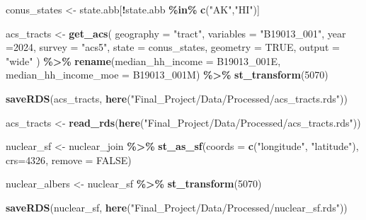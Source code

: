 \documentclass[
]{article}
\newenvironment{Shaded}{\begin{snugshade}}{\end{snugshade}}
\newcommand{\AttributeTok}[1]{\textcolor[rgb]{0.13,0.29,0.53}{#1}}
\newcommand{\ConstantTok}[1]{\textcolor[rgb]{0.56,0.35,0.01}{#1}}
\newcommand{\DecValTok}[1]{\textcolor[rgb]{0.00,0.00,0.81}{#1}}
\newcommand{\FunctionTok}[1]{\textcolor[rgb]{0.13,0.29,0.53}{\textbf{#1}}}
\newcommand{\NormalTok}[1]{#1}
\newcommand{\OtherTok}[1]{\textcolor[rgb]{0.56,0.35,0.01}{#1}}
\newcommand{\SpecialCharTok}[1]{\textcolor[rgb]{0.81,0.36,0.00}{\textbf{#1}}}
\newcommand{\StringTok}[1]{\textcolor[rgb]{0.31,0.60,0.02}{#1}}
\begin{document}
\begin{Shaded}
\begin{Highlighting}[]
\NormalTok{conus\_states }\OtherTok{\textless{}{-}}\NormalTok{ state.abb[}\SpecialCharTok{!}\NormalTok{state.abb }\SpecialCharTok{\%in\%} \FunctionTok{c}\NormalTok{(}\StringTok{"AK"}\NormalTok{,}\StringTok{"HI"}\NormalTok{)]}

\NormalTok{acs\_tracts }\OtherTok{\textless{}{-}} \FunctionTok{get\_acs}\NormalTok{(}
  \AttributeTok{geography =} \StringTok{"tract"}\NormalTok{, }
  \AttributeTok{variables =} \StringTok{"B19013\_001"}\NormalTok{, }
  \AttributeTok{year =}\DecValTok{2024}\NormalTok{, }
  \AttributeTok{survey =} \StringTok{"acs5"}\NormalTok{, }
  \AttributeTok{state =}\NormalTok{ conus\_states,}
  \AttributeTok{geometry =} \ConstantTok{TRUE}\NormalTok{,            }
  \AttributeTok{output =} \StringTok{"wide"}
\NormalTok{) }\SpecialCharTok{\%\textgreater{}\%}
  \FunctionTok{rename}\NormalTok{(}\AttributeTok{median\_hh\_income =}\NormalTok{ B19013\_001E,}
         \AttributeTok{median\_hh\_income\_moe =}\NormalTok{ B19013\_001M) }\SpecialCharTok{\%\textgreater{}\%}
  \FunctionTok{st\_transform}\NormalTok{(}\DecValTok{5070}\NormalTok{)  }

\FunctionTok{saveRDS}\NormalTok{(acs\_tracts, }\FunctionTok{here}\NormalTok{(}\StringTok{"Final\_Project/Data/Processed/acs\_tracts.rds"}\NormalTok{))}
\end{Highlighting}
\end{Shaded}

\begin{Shaded}
\begin{Highlighting}[]
\NormalTok{acs\_tracts }\OtherTok{\textless{}{-}} \FunctionTok{read\_rds}\NormalTok{(}\FunctionTok{here}\NormalTok{(}\StringTok{"Final\_Project/Data/Processed/acs\_tracts.rds"}\NormalTok{))}
\end{Highlighting}
\end{Shaded}

\begin{Shaded}
\begin{Highlighting}[]
\NormalTok{nuclear\_sf }\OtherTok{\textless{}{-}}\NormalTok{ nuclear\_join }\SpecialCharTok{\%\textgreater{}\%}
  \FunctionTok{st\_as\_sf}\NormalTok{(}\AttributeTok{coords =} \FunctionTok{c}\NormalTok{(}\StringTok{"longitude"}\NormalTok{, }\StringTok{"latitude"}\NormalTok{), }\AttributeTok{crs=}\DecValTok{4326}\NormalTok{, }\AttributeTok{remove =} \ConstantTok{FALSE}\NormalTok{)}

\NormalTok{nuclear\_albers }\OtherTok{\textless{}{-}}\NormalTok{ nuclear\_sf }\SpecialCharTok{\%\textgreater{}\%} \FunctionTok{st\_transform}\NormalTok{(}\DecValTok{5070}\NormalTok{)}

\FunctionTok{saveRDS}\NormalTok{(nuclear\_sf, }
        \FunctionTok{here}\NormalTok{(}\StringTok{"Final\_Project/Data/Processed/nuclear\_sf.rds"}\NormalTok{))}
\end{Highlighting}
\end{Shaded}
\end{document}
